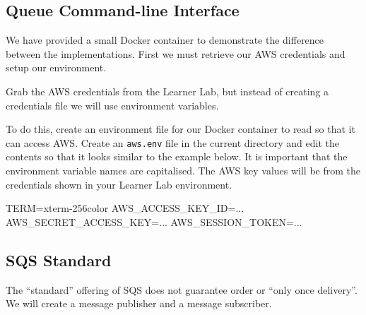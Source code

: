 \documentclass{csse4400}
\begin{document}
\subsection{Queue Command-line Interface}\label{sec:q-cli}

We have provided a small Docker container to demonstrate the difference between the implementations.
First we must retrieve our AWS credentials and setup our environment.

Grab the AWS credentials from the Learner Lab,
but instead of creating a credentials file we will use environment variables.

To do this, create an environment file for our Docker container to read so that it can access AWS.
Create an \texttt{aws.env} file in the current directory and edit the contents so that it looks similar to the example below.
It is important that the environment variable names are capitalised.
The AWS key values will be from the credentials shown in your Learner Lab environment.

\begin{code}[numbers=none]{}
TERM=xterm-256color
AWS_ACCESS_KEY_ID=...
AWS_SECRET_ACCESS_KEY=...
AWS_SESSION_TOKEN=...
\end{code}



\subsection{SQS Standard}

The ``standard'' offering of SQS does not guarantee order or ``only once delivery''. 
We will create a message publisher and a message subscriber.

\end{document}
